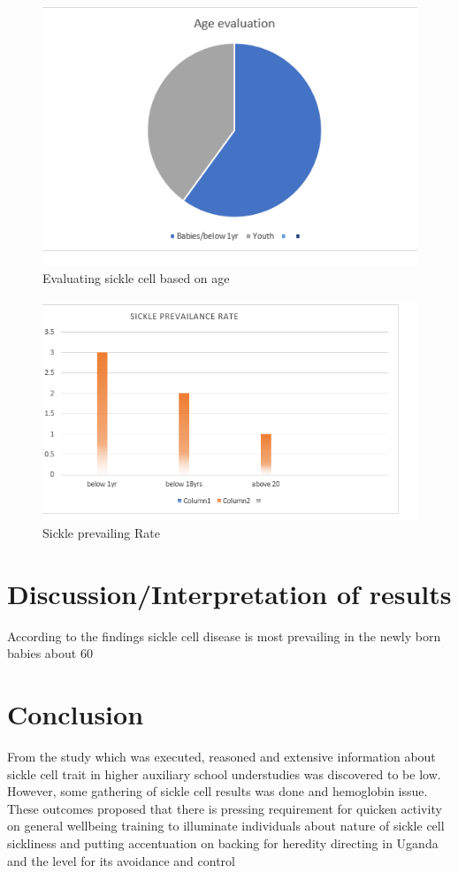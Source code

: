 \documentclass[12pt,]{article}
\begin{document}
\begin{figure}
\includegraphics[width=\linewidth]{capture2.png}
\caption{Evaluating sickle cell based on age}
\end{figure}
\begin{figure}
\includegraphics[width=\linewidth]{capture 3.png}
\caption{Sickle prevailing Rate}
\end{figure}

\section{Discussion/Interpretation of results}
According to the findings sickle cell disease is most prevailing in the newly born babies about 60%
\section{Conclusion}
From the study which was executed, reasoned and extensive information about sickle cell trait in higher auxiliary school understudies was discovered to be low. However, some gathering of sickle cell results was done and hemoglobin issue. These outcomes proposed that there is pressing requirement for quicken activity on general wellbeing training to illuminate individuals about nature of sickle cell sickliness and putting accentuation on backing for heredity directing in Uganda and the level for its avoidance and control
\end{document}
